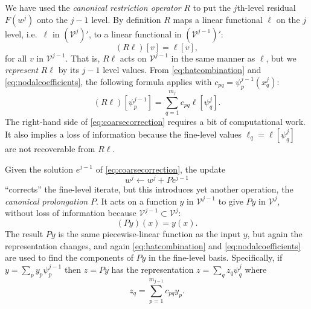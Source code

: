 \documentclass[letterpaper,final,12pt,reqno]{amsart}
\theoremstyle{claim}
\numberwithin{equation}{section}
\numberwithin{figure}{section}
\numberwithin{table}{section}
\begin{document}
We have used the \emph{canonical restriction operator} $R$ to put the $j$th-level residual $F(w^j)$ onto the $j-1$ level.  By definition $R$ maps a linear functional $\ell$ on the $j$ level, i.e.~$\ell$ in $(\mathcal{V}^j)'$, to a linear functional in $(\mathcal{V}^{j-1})'$:
\begin{equation}
  (R \ell)[v] = \ell[v], \label{eq:canonicalrestriction}
\end{equation}
for all $v$ in $\mathcal{V}^{j-1}$.  That is, $R \ell$ acts on $\mathcal{V}^{j-1}$ in the same manner as $\ell$, but we \emph{represent} $R\ell$ by its $j-1$ level values.  From \eqref{eq:hatcombination} and \eqref{eq:nodalcoefficients}, the following formula applies with $c_{pq}=\psi_p^{j-1}(x_q^j)$:
\begin{equation}
  (R \ell)[\psi_p^{j-1}] = \sum_{q=1}^{m_j} c_{pq} \ell[\psi_q^j].  \label{eq:canonicalrestrictionaction}
\end{equation}
The right-hand side of \eqref{eq:coarsecorrection} requires a bit of computational work.  It also implies a loss of information because the fine-level values $\ell_q=\ell[\psi_q^j]$ are not recoverable from $R\ell$.

Given the solution $e^{j-1}$ of \eqref{eq:coarsecorrection}, the update
\begin{equation}
  w^j \gets w^j + P e^{j-1}  \label{eq:update}
\end{equation}
``corrects'' the fine-level iterate, but this introduces yet another operation, the \emph{canonical prolongation} $P$.  It acts on a function $y$ in $\mathcal{V}^{j-1}$ to give $Py$ in $\mathcal{V}^j$, without loss of information because $\mathcal{V}^{j-1} \subset \mathcal{V}^j$:
\begin{equation}
  (P y)(x) = y(x). \label{eq:canonicalprolongation}
\end{equation}
The result $P y$ is the same piecewise-linear function as the input $y$, but again the representation changes, and again \eqref{eq:hatcombination} and \eqref{eq:nodalcoefficients} are used to find the components of $Py$ in the fine-level basis.  Specifically, if $y=\sum_p y_p \psi_p^{j-1}$ then $z=Py$ has the representation $z = \sum_q z_q \psi_q^j$ where
\begin{equation}
  z_q = \sum_{p=1}^{m_{j-1}} c_{pq} y_p. \label{eq:canonicalprolongationaction}
\end{equation}
\end{document}
